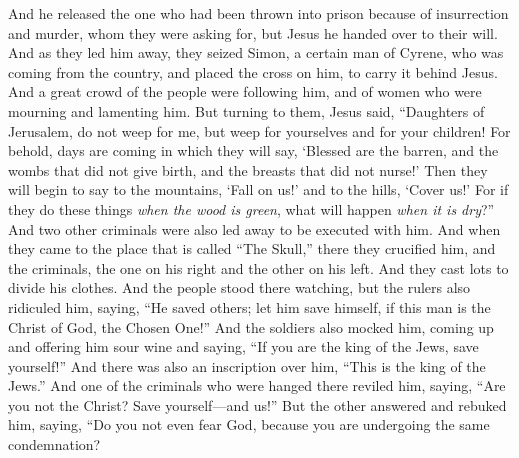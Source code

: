 \begin{biblechapter}
\verse And he released the one who had been thrown into prison because of insurrection and murder, whom they were asking for, but Jesus he handed over to their will.
 And as they led him away, they seized Simon, a certain man of Cyrene, who was coming from the country, and placed the cross on him, to carry it behind Jesus.
\verse And a great crowd of the people were following him, and of women who were mourning and lamenting him.
\verse But turning to them, Jesus said, “Daughters of Jerusalem, do not weep for me, but weep for yourselves and for your children!
\verse For behold, days are coming in which they will say, ‘Blessed are the barren, and the wombs that did not give birth, and the breasts that did not nurse!’
\verse Then they will begin to say to the mountains, ‘Fall on us!’ and to the hills, ‘Cover us!’
\verse For if they do these things \textit{when the wood is green}, what will happen \textit{when it is dry}?”
\verse And two other criminals were also led away to be executed with him.
\verse And when they came to the place that is called “The Skull,” there they crucified him, and the criminals, the one on his right and the other on his left.
\verse {} And they cast lots to divide his clothes.
\verse And the people stood there watching, but the rulers also ridiculed him, saying, “He saved others; let him save himself, if this man is the Christ of God, the Chosen One!”
\verse And the soldiers also mocked him, coming up and offering him sour wine
\verse and saying, “If you are the king of the Jews, save yourself!”
\verse And there was also an inscription over him, “This is the king of the Jews.”
\verse And one of the criminals who were hanged there reviled him, saying, “Are you not the Christ? Save yourself—and us!”
\verse But the other answered and rebuked him, saying, “Do you not even fear God, because you are undergoing the same condemnation?

\end{biblechapter}
